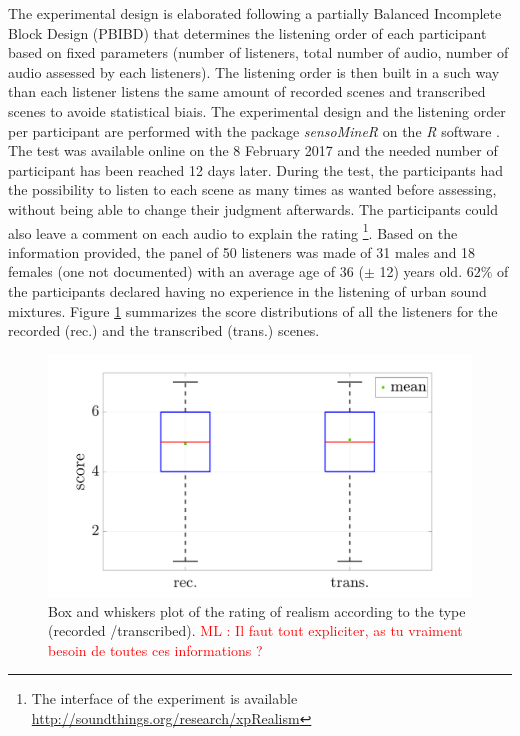 \documentclass[review,5p,twocolumn,sort&compress,times]{elsarticle}
\newcommand{\ml}[1]{\textcolor{red}{ML : #1}}
\begin{document}
The experimental design is elaborated following a partially Balanced Incomplete Block Design (PBIBD) \cite{john1977optimal} that determines the listening order of each participant based on fixed parameters (number of listeners, total number of audio, number of audio assessed by each listeners). The listening order is then built in a such way than each listener listens the same amount of recorded scenes and transcribed scenes to avoide statistical biais. The experimental design and the listening order per participant are performed with the package \textit{sensoMineR} on the \textit{R} software \cite{le_sensominer:_2008}.\\

The test was available online on the 8 February 2017 and the needed number of participant has been reached 12 days later. During the test, the participants had the possibility to listen to each scene as many times as wanted before assessing, without being able to change their judgment afterwards. The participants could also leave a comment on each audio to explain the rating \footnote{The interface of the experiment is available \url{http://soundthings.org/research/xpRealism}}. Based on the information provided, the panel of 50 listeners was made of 31 males and 18 females (one not documented) with an average age of 36 ($\pm$ 12) years old. $62\%$ of the participants declared having no experience in the listening of urban sound mixtures. Figure \ref{fig:boxPlot_test} summarizes the score distributions of all the listeners for the recorded (rec.) and the transcribed (trans.) scenes.

\begin{figure}[t]
\centering
\includegraphics[width=\linewidth]{figures/testPerceptif_boxplotType_EN.pdf}
\caption{Box and whiskers plot of the rating of realism according to the type (recorded /transcribed). \ml{Il faut tout expliciter, as tu vraiment besoin de toutes ces informations ?}}
\label{fig:boxPlot_test}
\end{figure}
\end{document}
